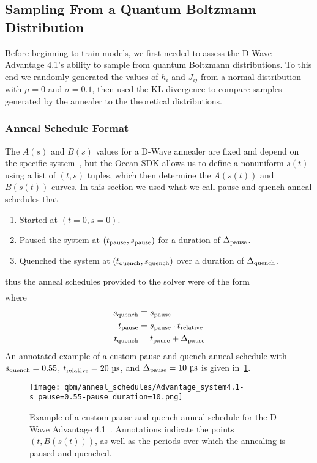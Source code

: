 \subsection{Sampling From a Quantum Boltzmann Distribution}
Before beginning to train models, we first needed to assess the D-Wave Advantage 4.1's ability to sample from quantum Boltzmann distributions.
To this end we randomly generated the values of \( h_i \) and \( J_{ij} \) from a normal distribution with \( \mu = 0 \) and \( \sigma = 0.1 \), then used the KL divergence to compare samples generated by the annealer to the theoretical distributions.

\subsubsection{Anneal Schedule Format}
The \( A(s) \) and \( B(s) \) values for a D-Wave annealer are fixed and depend on the specific system~\cite{dwave_anneal_schedules}, but the Ocean SDK allows us to define a nonuniform \( s(t) \) using a list of \( (t, s) \) tuples, which then determine the \( A(s(t)) \) and \( B(s(t)) \) curves.
In this section we used what we call pause-and-quench anneal schedules that
\begin{enumerate}
    \item Started at \( (t = 0, s = 0) \).
    \item Paused the system at \( (t_{\text{pause}}, s_{\text{pause}}) \) for a duration of \( \Delta_{\text{pause}} \).
    \item Quenched the system at \( (t_{\text{quench}}, s_{\text{quench}}) \) over a duration of \( \Delta_{\text{quench}} \).
\end{enumerate}
thus the anneal schedules provided to the solver were of the form
\begin{align}
    [
        (0, 0),
        (\tpause, \spause),
        (\tquench, \squench),
        (\tquench + \Deltaquench, 1)
    ]
\end{align}
where
\begin{align}
\begin{split}
    s_{\text{quench}} &\equiv s_{\text{pause}} \\
    t_{\text{pause}} &= s_{\text{pause}} \cdot t_{\text{relative}} \\
    t_{\text{quench}} &= t_{\text{pause}} + \Delta_{\text{pause}}
\end{split}
\end{align}
An annotated example of a custom pause-and-quench anneal schedule with \( s_{\text{quench}} = 0.55 \), \( t_{\text{relative}} = 20 \ \si{\micro\second} \), and \( \Deltapause = 10 \ \si{\micro\second} \) is given in~\cref{fig:anneal_schedule_annotated}.
\begin{figure}[!htb]
    \begin{center}
        \texttt{[image: qbm/anneal\_schedules/Advantage\_system4.1-s\_pause=0.55-pause\_duration=10.png]}
    \end{center}
    \caption{
        Example of a custom pause-and-quench anneal schedule for the D-Wave Advantage 4.1~\cite{dwave_anneal_schedules}.
        Annotations indicate the points \( (t, B(s(t))) \), as well as the periods over which the annealing is paused and quenched.
    }
    \label{fig:anneal_schedule_annotated}
\end{figure}

